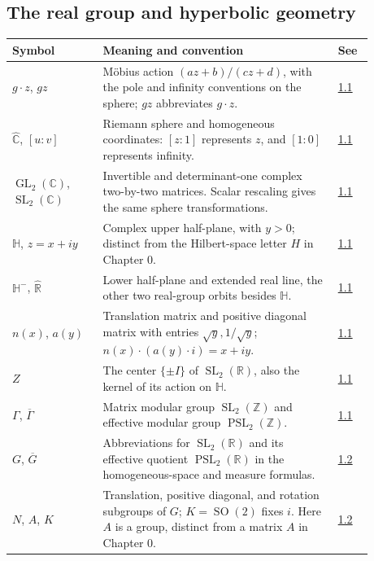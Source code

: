 \subsection*{The real group and hyperbolic geometry}\label{v1a-notation-hyperbolic}

\begin{longtable}{p{0.22\linewidth}p{0.58\linewidth}p{0.08\linewidth}}
\textbf{Symbol} & \textbf{Meaning and convention} & \textbf{See} \\ \hline
$g\cdot z$, $gz$ & Möbius action $(az+b)/(cz+d)$, with the pole and infinity conventions on the sphere; $gz$ abbreviates $g\cdot z$. & \hyperref[hyperbolic.riemann-sphere]{1.1} \\
$\widehat{\mathbb C}$, $[u:v]$ & Riemann sphere and homogeneous coordinates: $[z:1]$ represents $z$, and $[1:0]$ represents infinity. & \hyperref[hyperbolic.sphere-action]{1.1} \\
$\operatorname{GL}_2(\mathbb C)$, $\operatorname{SL}_2(\mathbb C)$ & Invertible and determinant-one complex two-by-two matrices. Scalar rescaling gives the same sphere transformations. & \hyperref[hyperbolic.scalar-normalization]{1.1} \\
$\mathbb H$, $z=x+iy$ & Complex upper half-plane, with $y>0$; distinct from the Hilbert-space letter $H$ in Chapter 0. & \hyperref[hyperbolic.half-plane]{1.1} \\
$\mathbb H^-$, $\widehat{\mathbb R}$ & Lower half-plane and extended real line, the other two real-group orbits besides $\mathbb H$. & \hyperref[hyperbolic.three-orbits]{1.1} \\
$n(x)$, $a(y)$ & Translation matrix and positive diagonal matrix with entries $\sqrt y,1/\sqrt y$; $n(x)\cdot(a(y)\cdot i)=x+iy$. & \hyperref[hyperbolic.three-orbits]{1.1} \\
$Z$ & The center $\{\pm I\}$ of $\operatorname{SL}_2(\mathbb R)$, also the kernel of its action on $\mathbb H$. & \hyperref[hyperbolic.projective-group]{1.1} \\
$\Gamma$, $\overline\Gamma$ & Matrix modular group $\operatorname{SL}_2(\mathbb Z)$ and effective modular group $\operatorname{PSL}_2(\mathbb Z)$. & \hyperref[hyperbolic.projective-group]{1.1} \\
$G$, $\overline G$ & Abbreviations for $\operatorname{SL}_2(\mathbb R)$ and its effective quotient $\operatorname{PSL}_2(\mathbb R)$ in the homogeneous-space and measure formulas. & \hyperref[hyperbolic.group-abbreviations]{1.2} \\
$N$, $A$, $K$ & Translation, positive diagonal, and rotation subgroups of $G$; $K=\operatorname{SO}(2)$ fixes $i$. Here $A$ is a group, distinct from a matrix $A$ in Chapter 0. & \hyperref[hyperbolic.iwasawa-coordinates]{1.2} \\

\end{longtable}
